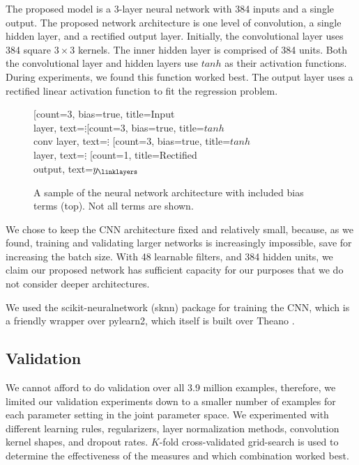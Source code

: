 \documentclass{article}
\begin{document}
The proposed model is a 3-layer neural network with 384 inputs and a single output.  The proposed network architecture is one level of convolution, a single hidden layer, and a rectified output layer.  Initially, the convolutional layer uses 384 square $3\times3$ kernels.  The inner hidden layer is comprised of 384 units.  Both the convolutional layer and hidden layers use $tanh$ as their activation functions.  During experiments, we found this function worked best.  The output layer uses a rectified linear activation function to fit the regression problem.

\begin{figure}[ht]
\centering
\begin{neuralnetwork}[height=4]
	\newcommand{\nodetextclear}[2]{}
	\newcommand{\nodetextx}[2]{$X_#2$}
	\newcommand{\nodetexty}[2]{$y_#2$}
	\newcommand{\mynodetext}[2]{$\vdots$}
	\setdefaultnodetext{\mynodetext}
	[count=3, bias=true, title=Input\\layer, text=\mynodetext]
	\hiddenlayer[count=3, bias=true, title=$tanh$\\conv layer, text=\mynodetext] \linklayers
	\hiddenlayer[count=3, bias=true, title=$tanh$\\layer, text=\mynodetext] \linklayers
	\outputlayer[count=1, title=Rectified\\output, text=\nodetexty] \linklayers
\end{neuralnetwork}
\caption{A sample of the neural network architecture with included bias terms (top).  Not all terms are shown.}
\end{figure}

We chose to keep the CNN architecture fixed and relatively small, because, as we found, training and validating larger networks is increasingly impossible, save for increasing the batch size.  With 48 learnable filters, and 384 hidden units, we claim our proposed network has sufficient capacity for our purposes that we do not consider deeper architectures.

We used the scikit-neuralnetwork (sknn) package for training the CNN, which is a friendly wrapper over pylearn2, which itself is built over Theano \cite{theano}.

\subsection{Validation}

We cannot afford to do validation over all 3.9 million examples, therefore, we limited our validation experiments down to a smaller number of examples for each parameter setting in the joint parameter space.  We experimented with different learning rules, regularizers, layer normalization methods, convolution kernel shapes, and dropout rates.  $K$-fold cross-validated grid-search is used to determine the effectiveness of the measures and which combination worked best.
\end{document}
